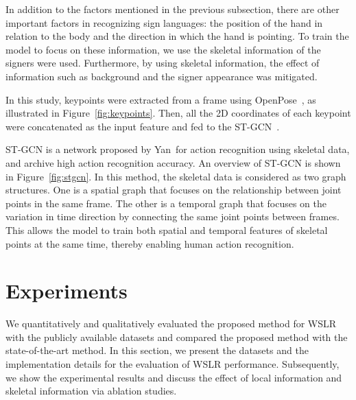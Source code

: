 \documentclass[journal]{IEEEtran}
\begin{document}
In addition to the factors mentioned in the previous subsection, there are other important factors in recognizing sign languages: the position of the hand in relation to the body and the direction in which the hand is pointing.
To train the model to focus on these information, we use the skeletal information of the signers were used.
Furthermore, by using skeletal information, the effect of information such as background and the signer appearance was mitigated.

In this study, keypoints were extracted from a frame using OpenPose~\cite{cao2017openpose}, as illustrated in Figure~\ref{fig:keypoints}.
Then, all the 2D coordinates of each keypoint were concatenated as the input feature and fed to the ST-GCN~\cite{yan2018stgcn}. 

ST-GCN is a network proposed by Yan~\etal for action recognition using skeletal data, and archive high action recognition accuracy.
An overview of ST-GCN is shown in Figure~\ref{fig:stgcn}.
In this method, the skeletal data is considered as two graph structures.
One is a spatial graph that focuses on the relationship between joint points in the same frame.
The other is a temporal graph that focuses on the variation in time direction by connecting the same joint points between frames.
This allows the model to train both spatial and temporal features of skeletal points at the same time, thereby enabling human action recognition.
\fi




\section{Experiments}\label{experiment}
We quantitatively and qualitatively evaluated the proposed method for WSLR with the publicly available datasets and compared the proposed method with the state-of-the-art method. In this section, we present the datasets and the implementation details for the evaluation of WSLR performance.  
Subsequently, we show the experimental results and discuss the effect of local information 
and skeletal information via ablation studies. 
\end{document}
